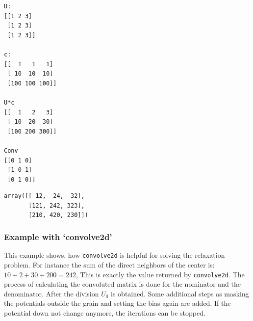 \documentclass[11pt]{article}
\makeatletter
\newcommand{\boxspacing}{\kern\kvtcb@left@rule\kern\kvtcb@boxsep}
\newcommand{\prompt}[4]{
        \ttfamily\llap{{\color{#2}[#3]:\hspace{3pt}#4}}\vspace{-\baselineskip}
    }
\makeatother
\begin{document}
    \begin{Verbatim}[commandchars=\\\{\}]
U:
[[1 2 3]
 [1 2 3]
 [1 2 3]]

c:
[[  1   1   1]
 [ 10  10  10]
 [100 100 100]]

U*c
[[  1   2   3]
 [ 10  20  30]
 [100 200 300]]

Conv
[[0 1 0]
 [1 0 1]
 [0 1 0]]

    \end{Verbatim}

            \begin{tcolorbox}[breakable, size=fbox, boxrule=.5pt, pad at break*=1mm, opacityfill=0]
\prompt{Out}{outcolor}{61}{\boxspacing}
\begin{Verbatim}[commandchars=\\\{\}]
array([[ 12,  24,  32],
       [121, 242, 323],
       [210, 420, 230]])
\end{Verbatim}
\end{tcolorbox}
        
    \hypertarget{example-with-convolve2d}{%
\subsubsection{Example with
`convolve2d'}\label{example-with-convolve2d}}

This example shows, how \texttt{convolve2d} is helpful for solving the
relaxation problem. For instance the sum of the direct neighbors of the
center is: \(10+2+30+200=242\), This is exactly the value returned by
\texttt{convolve2d}. The process of calculating the convoluted matrix is
done for the nominator and the denominator. After the division \(U_0\)
is obtained. Some additional steps as masking the potentials outside the
grain and setting the bias again are added. If the potential down not
change anymore, the iterations can be stopped.
\end{document}
